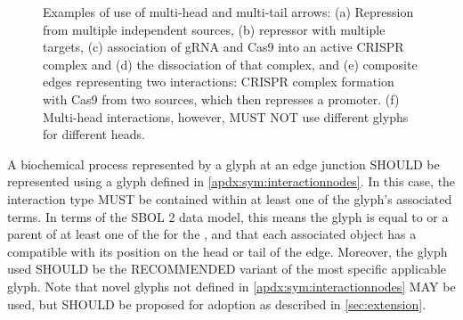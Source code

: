 \begin{enumerate}
{\begin{figure}[h!]
	\caption{Examples of use of multi-head and multi-tail arrows: 
	(a) Repression from multiple independent sources, (b) repressor with multiple targets, 
	(c) association of gRNA and Cas9 into an active CRISPR complex and (d) the dissociation of that complex, and
	(e) composite edges representing two interactions: CRISPR complex formation with Cas9 from two sources, which then represses a promoter.
	(f) Multi-head interactions, however, MUST NOT use different glyphs for different heads.}
	\label{exa:4d}
	\end{figure}

\item A biochemical process represented by a glyph at an edge junction SHOULD be represented using a glyph defined in \ref{apdx:sym:interactionnodes}. In this case, the interaction type MUST be contained within at least one of the glyph's associated terms.
In terms of the SBOL 2 data model, this means the glyph is equal to or a parent of at least one of the  for the , and that each associated  object has a  compatible with its position on the head or tail of the edge.
	Moreover, the glyph used SHOULD be the RECOMMENDED variant of the most specific applicable glyph.  Note that novel glyphs not defined in \ref{apdx:sym:interactionnodes} MAY be used, but SHOULD be proposed for adoption as described in \ref{sec:extension}.
}

\end{enumerate}

